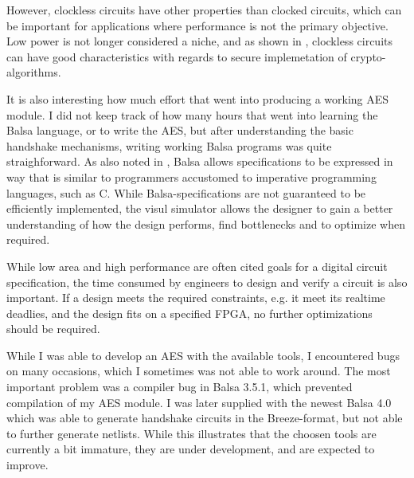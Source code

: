 However, clockless circuits have other properties than clocked
circuits, which can be important for applications where performance is
not the primary objective. Low power is not longer considered a niche,
and as shown in \cite{claes}, clockless circuits can have good
characteristics with regards to secure implemetation of
crypto-algorithms.

It is also interesting how much effort that went into producing a
working AES module. I did not keep track of how many hours that went
into learning the Balsa language, or to write the AES, but after
understanding the basic handshake mechanisms, writing working Balsa
programs was quite straighforward. As also noted in \cite{xxx}, Balsa
allows specifications to be expressed in way that is similar to
programmers accustomed to imperative programming languages, such as
C. While Balsa-specifications are not guaranteed to be efficiently
implemented, the visul simulator allows the designer to gain a better
understanding of how the design performs, find bottlenecks and to
optimize when required.

While low area and high performance are often cited goals for a
digital circuit specification, the time consumed by engineers to
design and verify a circuit is also important. If a design meets the
required constraints, e.g. it meet its realtime deadlies, and the
design fits on a specified FPGA, no further optimizations should be
required.

While I was able to develop an AES with the available tools, I
encountered bugs on many occasions, which I sometimes was not able to
work around. The most important problem was a compiler bug in Balsa
3.5.1, which prevented compilation of my AES module. I was later
supplied with the newest Balsa 4.0 which was able to generate
handshake circuits in the Breeze-format, but not able to further
generate netlists. While this illustrates that the choosen tools are
currently a bit immature, they are under development, and are expected
to improve.

